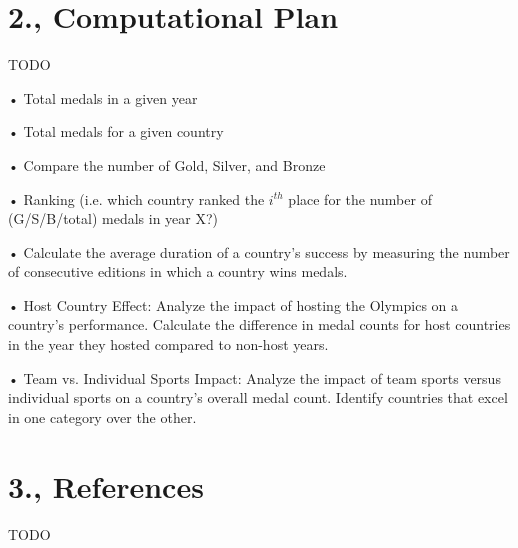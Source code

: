 \documentclass[fontsize=11pt]{article}
\begin{document}
\section*{2., Computational Plan}

TODO

 • Total medals in a given year

 • Total medals for a given country

 • Compare the number of Gold, Silver, and Bronze

 • Ranking (i.e. which country ranked the $i^{th}$ place for the number of (G/S/B/total) medals in year X?)

• Calculate the average duration of a country's success by measuring the number of consecutive editions in which a country wins medals. 

• Host Country Effect:
Analyze the impact of hosting the Olympics on a country's performance. Calculate the difference in medal counts for host countries in the year they hosted compared to non-host years.

• Team vs. Individual Sports Impact:
Analyze the impact of team sports versus individual sports on a country's overall medal count. Identify countries that excel in one category over the other.


\section*{3., References}

TODO

\end{document}
